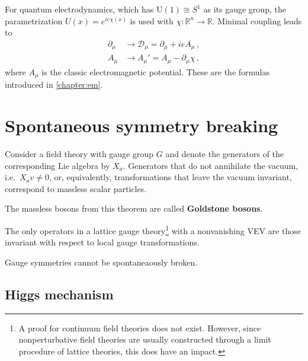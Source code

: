     \begin{example}[QED]
        For quantum electrodynamics, which has $\mathrm{U}(1)\cong S^1$ as its gauge group, the parametrization $U(x)=e^{ie\chi(x)}$ is used with $\chi:\mathbb{R}^n\rightarrow\mathbb{R}$. Minimal coupling leads to
        \begin{align}
            \partial_\mu &\longrightarrow\mathcal{D}_\mu = \partial_\mu + ieA_\mu\,,\\
            A_\mu &\longrightarrow A_\mu' = A_\mu - \partial_\mu\chi\,,
        \end{align}
        where $A_\mu$ is the classic electromagnetic potential. These are the formulas introduced in \cref{chapter:em}.
    \end{example}

\section{Spontaneous symmetry breaking}

    \begin{theorem}[Goldstone]
        Consider a field theory with gauge group $G$ and denote the generators of the corresponding Lie algebra by $X_a$. Generators that do not annihilate the vacuum, i.e.~$X_av\neq0$, or, equivalently, transformations that leave the vacuum invariant, correspond to massless scalar particles.
    \end{theorem}
    The massless bosons from this theorem are called \textbf{Goldstone bosons}.

    \begin{theorem}[Elitzur]\label{gauge:elitzur}
        The only operators in a lattice gauge theory\footnote{A proof for continuum field theories does not exist. However, since nonperturbative field theories are usually constructed through a limit procedure of lattice theories, this does have an impact.} with a nonvanishing VEV are those invariant with respect to local gauge transformations.
    \end{theorem}
    \begin{result}
        Gauge symmetries cannot be spontaneaously broken.
    \end{result}

\subsection{Higgs mechanism}\label{section:higgs_mechanism}

